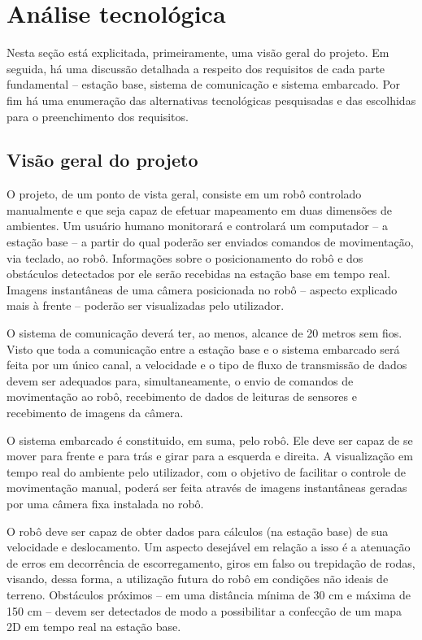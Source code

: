 \chapter{Análise tecnológica}
Nesta seção está explicitada, primeiramente, uma visão geral do projeto. Em seguida, há uma discussão detalhada a respeito dos requisitos de cada parte fundamental -- estação base, sistema de comunicação e sistema embarcado. Por fim há uma enumeração das alternativas tecnológicas pesquisadas e das escolhidas para o preenchimento dos requisitos.

\section{Visão geral do projeto}

O projeto, de um ponto de vista geral, consiste em um robô controlado manualmente e que seja capaz de efetuar mapeamento em duas dimensões de ambientes. Um usuário humano monitorará e controlará um computador -- a estação base -- a partir do qual poderão ser enviados comandos de movimentação, via teclado, ao robô. Informações sobre o posicionamento do robô e dos obstáculos detectados por ele serão recebidas na estação base em tempo real. Imagens instantâneas de uma câmera posicionada no robô -- aspecto explicado mais à frente -- poderão ser visualizadas pelo utilizador.

O sistema de comunicação deverá ter, ao menos, alcance de 20 metros sem fios. Visto que toda a comunicação entre a estação base e o sistema embarcado será feita por um único canal, a velocidade e o tipo de fluxo de transmissão de dados devem ser adequados para, simultaneamente, o envio de comandos de movimentação ao robô, recebimento de dados de leituras de sensores e recebimento de imagens da câmera.

O sistema embarcado é constituido, em suma, pelo robô. Ele deve ser capaz de se mover para frente e para trás e girar para a esquerda e direita. A visualização em tempo real do ambiente pelo utilizador, com o objetivo de facilitar o controle de movimentação manual, poderá ser feita através de imagens instantâneas geradas por uma câmera fixa instalada no robô. 

O robô deve ser capaz de obter dados para cálculos (na estação base) de sua velocidade e deslocamento. Um aspecto desejável em relação a isso é a atenuação de erros em decorrência de escorregamento, giros em falso ou trepidação de rodas, visando, dessa forma, a utilização futura do robô em condições não ideais de terreno. Obstáculos próximos -- em uma distância mínima de 30 cm e máxima de 150 cm -- devem ser detectados de modo a possibilitar a confecção de um mapa 2D em tempo real na estação base.



